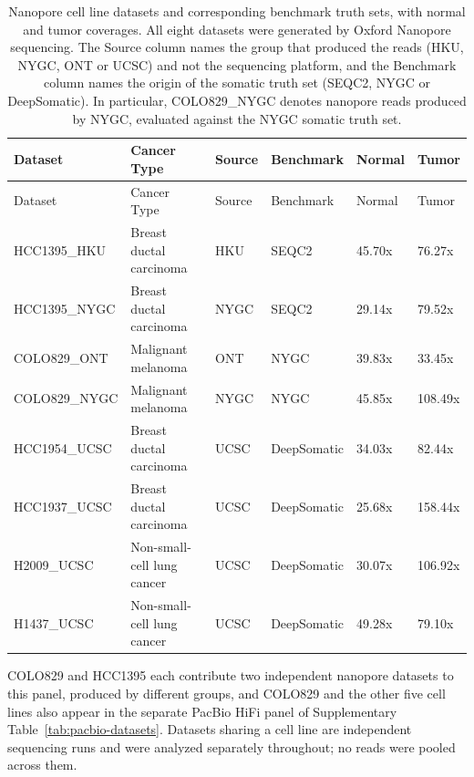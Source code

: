 \documentclass[pdflatex,sn-nature]{sn-jnl}
\begin{document}
{\small
\begin{longtable}{@{}llllll@{}}
  \caption[Nanopore cell line datasets and benchmark sources with coverage]%
  {Nanopore cell line datasets and corresponding benchmark truth sets, with normal and tumor coverages. All eight datasets were generated by Oxford Nanopore sequencing. The Source column names the group that produced the reads (HKU, NYGC, ONT or UCSC) and not the sequencing platform, and the Benchmark column names the origin of the somatic truth set (SEQC2, NYGC or DeepSomatic). In particular, COLO829\_NYGC denotes nanopore reads produced by NYGC, evaluated against the NYGC somatic truth set.}
  \label{tab:cell-line-datasets-and-benchmark-sources}\\
  \toprule
  Dataset & Cancer Type & Source & Benchmark & Normal & Tumor \\
  \midrule
  \endfirsthead
  \toprule
  Dataset & Cancer Type & Source & Benchmark & Normal & Tumor \\
  \midrule
  \endhead
  \bottomrule
  \endlastfoot
  HCC1395\_HKU   & Breast ductal carcinoma                & HKU  & SEQC2       & 45.70x & 76.27x \\
  HCC1395\_NYGC  & Breast ductal carcinoma                & NYGC & SEQC2       & 29.14x & 79.52x \\
  COLO829\_ONT   & Malignant melanoma                     & ONT  & NYGC        & 39.83x & 33.45x \\
  COLO829\_NYGC  & Malignant melanoma                     & NYGC & NYGC        & 45.85x & 108.49x \\
  HCC1954\_UCSC  & Breast ductal carcinoma                & UCSC & DeepSomatic & 34.03x & 82.44x \\
  HCC1937\_UCSC  & Breast ductal carcinoma                & UCSC & DeepSomatic & 25.68x & 158.44x \\
  H2009\_UCSC    & Non-small-cell lung cancer             & UCSC & DeepSomatic & 30.07x & 106.92x \\
  H1437\_UCSC    & Non-small-cell lung cancer             & UCSC & DeepSomatic & 49.28x & 79.10x \\
\end{longtable}
}

\noindent COLO829 and HCC1395 each contribute two independent nanopore datasets to this panel, produced by different groups, and COLO829 and the other five cell lines also appear in the separate PacBio HiFi panel of Supplementary Table~\ref{tab:pacbio-datasets}. Datasets sharing a cell line are independent sequencing runs and were analyzed separately throughout; no reads were pooled across them.
\end{document}
